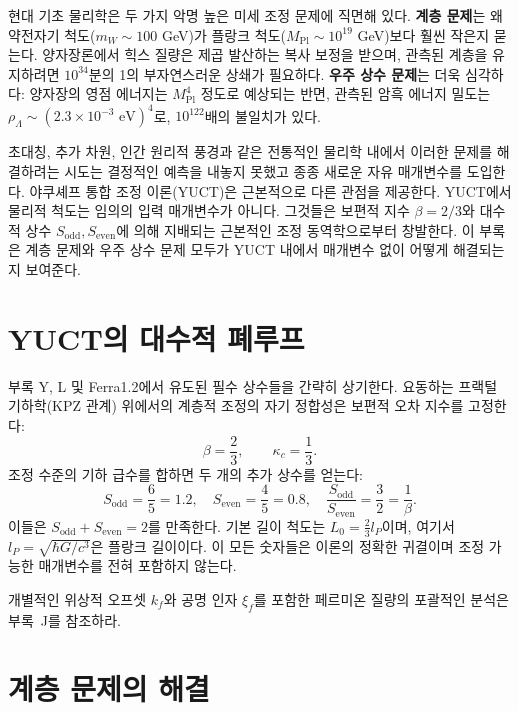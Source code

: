 \documentclass[11pt,a4paper]{article}
\theoremstyle{remark}
\begin{document}
	현대 기초 물리학은 두 가지 악명 높은 미세 조정 문제에 직면해 있다. \textbf{계층 문제}는 왜 약전자기 척도(\(m_W \sim 100\) GeV)가 플랑크 척도(\(M_{\mathrm{Pl}} \sim 10^{19}\) GeV)보다 훨씬 작은지 묻는다. 양자장론에서 힉스 질량은 제곱 발산하는 복사 보정을 받으며, 관측된 계층을 유지하려면 \(10^{34}\)분의 1의 부자연스러운 상쇄가 필요하다. \textbf{우주 상수 문제}는 더욱 심각하다: 양자장의 영점 에너지는 \(M_{\mathrm{Pl}}^4\) 정도로 예상되는 반면, 관측된 암흑 에너지 밀도는 \(\rho_\Lambda \sim (2.3 \times 10^{-3} \text{ eV})^4\)로, \(10^{122}\)배의 불일치가 있다.
	
	초대칭, 추가 차원, 인간 원리적 풍경과 같은 전통적인 물리학 내에서 이러한 문제를 해결하려는 시도는 결정적인 예측을 내놓지 못했고 종종 새로운 자유 매개변수를 도입한다. 야쿠셰프 통합 조정 이론(YUCT)은 근본적으로 다른 관점을 제공한다. YUCT에서 물리적 척도는 임의의 입력 매개변수가 아니다. 그것들은 보편적 지수 \(\beta = 2/3\)와 대수적 상수 \(S_{\mathrm{odd}}, S_{\mathrm{even}}\)에 의해 지배되는 근본적인 조정 동역학으로부터 창발한다. 이 부록은 계층 문제와 우주 상수 문제 모두가 YUCT 내에서 매개변수 없이 어떻게 해결되는지 보여준다.
	
	\section{YUCT의 대수적 폐루프}
	
	부록 Y, L 및 Ferra1.2에서 유도된 필수 상수들을 간략히 상기한다. 요동하는 프랙털 기하학(KPZ 관계) 위에서의 계층적 조정의 자기 정합성은 보편적 오차 지수를 고정한다:
	\begin{equation}
		\beta = \frac{2}{3}, \qquad \kappa_c = \frac{1}{3}.
	\end{equation}
	조정 수준의 기하 급수를 합하면 두 개의 추가 상수를 얻는다:
	\begin{equation}
		S_{\mathrm{odd}} = \frac{6}{5} = 1.2, \quad S_{\mathrm{even}} = \frac{4}{5} = 0.8, \quad \frac{S_{\mathrm{odd}}}{S_{\mathrm{even}}} = \frac{3}{2} = \frac{1}{\beta}.
	\end{equation}
	이들은 \(S_{\mathrm{odd}} + S_{\mathrm{even}} = 2\)를 만족한다. 기본 길이 척도는 \(L_0 = \frac{2}{3} l_P\)이며, 여기서 \(l_P = \sqrt{\hbar G / c^3}\)은 플랑크 길이이다. 이 모든 숫자들은 이론의 정확한 귀결이며 조정 가능한 매개변수를 전혀 포함하지 않는다.
	
	개별적인 위상적 오프셋 \(k_f\)와 공명 인자 \(\xi_f\)를 포함한 페르미온 질량의 포괄적인 분석은 부록~J를 참조하라.
	
	\section{계층 문제의 해결}
	
\end{document}
